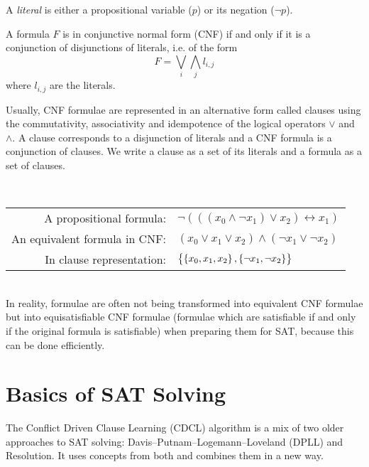 \newpage

\begin{note}[literal]
A \textit{literal} is either a propositional variable ($p$) or its negation ($\lnot p$).
\end{note}

\begin{tcolorbox}[colframe=defcolor,title={\color{white}\bf Conjunctive Normal Form (CNF)}]
\begin{definition}
A formula $F$ is in conjunctive normal form (CNF) if and only if it is a conjunction of disjunctions of literals, i.e. of the form \[
F=\bigvee_i\bigwedge_jl_{i,j}
\] where $l_{i,j}$ are the literals.
\end{definition}
\end{tcolorbox}
\begin{remark}
Usually, CNF formulae are represented in an alternative form called
clauses using the commutativity, associativity and idempotence of the logical
operators $\lor$ and $\land$. A clause corresponds to a disjunction of literals and a CNF
formula is a conjunction of clauses. We write a clause as a set of its literals and
a formula as a set of clauses. 
\end{remark}

\begin{example}
\ \begin{table}[h!]\centering{}
\begin{tabular}{rl}
	A propositional formula: & $\lnot(((x_0\land\lnot x_1)\lor x_2)\leftrightarrow x_1)$ \\
	An equivalent formula in CNF: & $(x_0\lor x_1\lor x_2)\land (\lnot x_1\lor \lnot x_2)$ \\
	In clause representation: & $\set{\set{x_0,x_1,x_2},\set{\lnot x_1,\lnot x_2}}$
\end{tabular}
\end{table}\\
In reality, formulae are often not being transformed into equivalent CNF formulae but into equisatisfiable CNF formulae (formulae which are satisfiable if
and only if the original formula is satisfiable) when preparing them for SAT,
because this can be done efficiently.
\end{example}

\newpage
\section{Basics of SAT Solving}

The Conflict Driven Clause Learning (CDCL) algorithm is a mix of two older approaches to SAT solving: Davis–Putnam–Logemann–Loveland (DPLL) and Resolution. It uses concepts from both and combines them in a new way.

